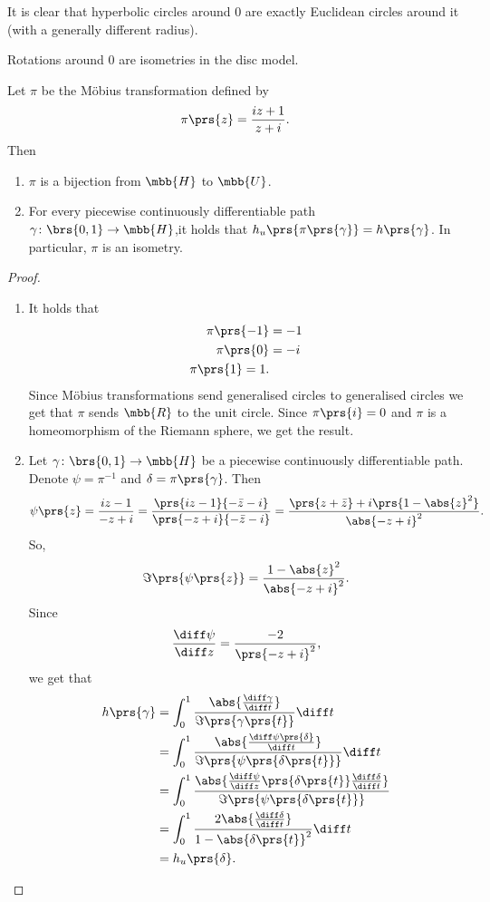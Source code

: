 \documentclass[10pt, twoside]{book}
\begin{document}
\begin{remark}
It is clear that hyperbolic circles around $0$ are exactly Euclidean circles around it (with a generally different radius).
\end{remark}

\begin{remark}
Rotations around $0$ are isometries in the disc model.
\end{remark}

\begin{lemma}
Let $\pi$ be the Möbius transformation defined by
\[\pi\prs{z} = \frac{iz + 1}{z + i} \text{.}\]
Then
\begin{enumerate}
\item $\pi$ is a bijection from $\mbb{H}$ to $\mbb{U}$.
\item For every piecewise continuously differentiable path $\gamma \colon \brs{0,1} \to \mbb{H}$,it holds that $h_u\prs{\pi\prs{\gamma}} = h\prs{\gamma}$.
In particular, $\pi$ is an isometry.
\end{enumerate}
\end{lemma}

\begin{proof}
\begin{enumerate}
\item It holds that
\begin{align*}
\pi\prs{-1} &= -1 \\
\pi\prs{0} &= -i \\
\pi\prs{1} = 1 \text{.}
\end{align*}
Since Möbius transformations send generalised circles to generalised circles we get that $\pi$ sends $\mbb{R}$ to the unit circle.
Since $\pi\prs{i} = 0$ and $\pi$ is a homeomorphism of the Riemann sphere, we get the result.

\item Let $\gamma \colon \brs{0,1} \to \mbb{H}$ be a piecewise continuously differentiable path. Denote $\psi = \pi^{-1}$ and $\delta = \pi\prs{\gamma}$.
Then
\[\psi\prs{z} = \frac{iz - 1}{-z + i} = \frac{\prs{iz - 1}{- \bar{z} - i}}{\prs{-z + i}{-\bar{z} - i}} = \frac{\prs{z + \bar{z}} + i \prs{1 - \abs{z}^2}}{\abs{-z + i}^2} \text{.}\]
So,
\[\Im\prs{\psi\prs{z}} = \frac{1 - \abs{z}^2}{\abs{-z + i}^2} \text{.}\]
Since
\[\frac{\diff \psi}{\diff z} = \frac{-2}{\prs{-z+i}^2} \text{,}\]
we get that
\begin{align*}
h\prs{\gamma} &= \int_0^1 \frac{\abs{\frac{\diff \gamma}{\diff t}}}{\Im\prs{\gamma\prs{t}}} \diff t
\\&=
\int_0^1 \frac{\abs{\frac{\diff \psi\prs{\delta}}{\diff t}}}{\Im \prs{\psi\prs{\delta\prs{t}}}} \diff t
\\&=
\int_0^1 \frac{\abs{\frac{\diff \psi}{\diff z} \prs{\delta\prs{t}} \frac{\diff \delta}{\diff t}}}{\Im \prs{\psi\prs{\delta\prs{t}}}}
\\&= \int_0^1 \frac{2 \abs{\frac{\diff \delta}{\diff t}}}{1 - \abs{\delta\prs{t}}^2} \diff t
\\&= h_u\prs{\delta} \text{.}
\end{align*}

\end{enumerate}
\end{proof}
\end{document}

